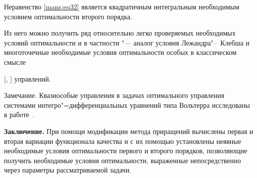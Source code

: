 \smallskip



Неравенство \eqref{mans:eq32} является квадратичным интегральным необходимым ус\-ло\-вием оптимальности второго порядка.

Из него можно получить ряд относительно легко проверяемых необходимых условий оптимальности и в частности "--- аналог условия Лежандра"--~Клебша и многоточечные необходимые условия оптимальности особых в классическом смысле

[, ] управлений.



\smallskip



{\small\sc Замечание.} Квазиособые управления в задачах оптимального управления системами интегро"=дифференциальных уравнений типа Вольтерра исследованы в работе~\cite{mans:13}.



\smallskip

\textbf{Заключение.} При помощи модификации метода приращений вычислены первая и вторая вариации функционала качества и с их помощью установлены неявные необходимые условия оптимальности первого и второго порядков, позволяющие получить необходимые условия оптимальности, выраженные непосредственно через параметры рассматриваемой задачи.



\bigskip




















